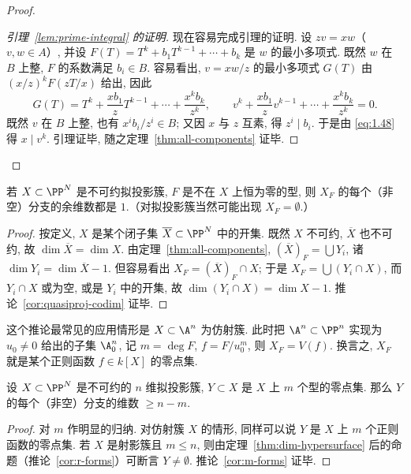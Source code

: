 \begin{proof}
\begin{proof}[引理~\ref{lem:prime-integral} 的证明]
		现在容易完成引理的证明. 设 $zv = xw$（$v, w \in A$）, 并设 $F(T) = T^k + b_1 T^{k-1} + \cdots + b_k$ 是 $w$ 的最小多项式. 既然 $w$ 在 $B$ 上整, $F$ 的系数满足 $b_i \in B$. 容易看出, $v = xw/z$ 的最小多项式 $G(T)$ 由 $(x/z)^k F(zT/x)$ 给出, 因此
		\begin{equation}
			\label{eq:1.48}
			G(T) = T^k + \frac{x b_1}{z} T^{k-1} + \cdots + \frac{x^k b_k}{z^k}, \qquad
			v^k + \frac{x b_1}{z} v^{k-1} + \cdots + \frac{x^k b_k}{z^k} = 0.
		\end{equation}
		既然 $v$ 在 $B$ 上整, 也有 $x^i b_i / z^i \in B$; 又因 $x$ 与 $z$ 互素, 得 $z^i \mid b_i$. 于是由 \eqref{eq:1.48} 得 $x \mid v^k$. 引理证毕, 随之定理~\ref{thm:all-components} 证毕.
	\end{proof}
\end{proof}

\begin{corollary}\label{cor:quasiproj-codim}
	若 $X \subset \PP^N$ 是不可约拟投影簇, $F$ 是不在 $X$ 上恒为零的型, 则 $X_F$ 的每个（非空）分支的余维数都是 $1$.（对拟投影簇当然可能出现 $X_F = \emptyset$.）
\end{corollary}

\begin{proof}
	按定义, $X$ 是某个闭子集 $\overline{X} \subset \PP^N$ 中的开集. 既然 $X$ 不可约, $\overline{X}$ 也不可约, 故 $\dim \overline{X} = \dim X$. 由定理~\ref{thm:all-components}, $(\overline X)_F = \bigcup Y_i$, 诸 $\dim Y_i = \dim \overline X - 1$. 但容易看出 $X_F = (\overline X)_F \cap X$; 于是 $X_F = \bigcup (Y_i \cap X)$, 而 $Y_i \cap X$ 或为空, 或是 $Y_i$ 中的开集, 故 $\dim(Y_i \cap X) = \dim X - 1$. 推论~\ref{cor:quasiproj-codim} 证毕.
\end{proof}

这个推论最常见的应用情形是 $X \subset \A^n$ 为仿射簇. 此时把 $\A^n \subset \PP^n$ 实现为 $u_0 \ne 0$ 给出的子集 $\A^n_0$, 记 $m = \deg F$, $f = F/u_0^m$, 则 $X_F = V(f)$. 换言之, $X_F$ 就是某个正则函数 $f \in k[X]$ 的零点集.

\begin{corollary}\label{cor:m-forms}
	设 $X \subset \PP^N$ 是不可约的 $n$ 维拟投影簇, $Y \subset X$ 是 $X$ 上 $m$ 个型的零点集. 那么 $Y$ 的每个（非空）分支的维数 $\ge n - m$.
\end{corollary}

\begin{proof}
	对 $m$ 作明显的归纳. 对仿射簇 $X$ 的情形, 同样可以说 $Y$ 是 $X$ 上 $m$ 个正则函数的零点集. 若 $X$ 是射影簇且 $m \le n$, 则由定理~\ref{thm:dim-hypersurface} 后的命题（推论~\ref{cor:r-forms}）可断言 $Y \ne \emptyset$. 推论~\ref{cor:m-forms} 证毕.
\end{proof}

